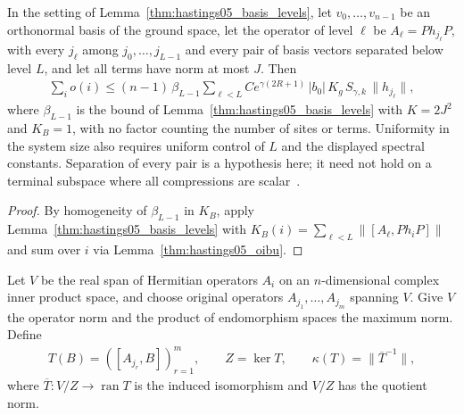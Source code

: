 \begin{lemma}
    \label{thm:hastings05_oibu_levels}
    \leanok
    In the setting of Lemma~\ref{thm:hastings05_basis_levels}, let $v_0,\dots,v_{n-1}$
    be an orthonormal basis of the ground space, let the operator of level
    $\ell$ be $A_\ell=Ph_{j_\ell}P$, with every $j_\ell$ among
    $j_0,\dots,j_{L-1}$ and every pair of basis vectors separated below level
    $L$, and let all terms have norm at most $J$. Then
    \begin{align}
        \sum_io(i)\le(n-1)\,\beta_{L-1}\sum_{\ell<L}Ce^{\gamma(2R+1)}\,|b_0|\,K_g\,
        S_{\gamma,k}\,\|h_{j_\ell}\|,
        \label{eq:hastings05_oibu_levels}
    \end{align}
    where $\beta_{L-1}$ is the bound of
    Lemma~\ref{thm:hastings05_basis_levels} with $K=2J^2$ and $K_B=1$,
    with no factor counting the number of sites or terms. Uniformity in the system
    size also requires uniform control of $L$ and the displayed spectral constants.
    Separation of every pair is a hypothesis here; it need not hold on a terminal
    subspace where all compressions are scalar~\cite{gap:hastings05_two_dim_ground_basis}.
\end{lemma}
\begin{proof}\leanok
    By homogeneity of $\beta_{L-1}$ in $K_B$, apply
    Lemma~\ref{thm:hastings05_basis_levels} with
    $K_B(i)=\sum_{\ell<L}\|[A_\ell,Ph_iP]\|$ and sum over $i$ via
    Lemma~\ref{thm:hastings05_oibu}.
\end{proof}

\begin{definition}
    \label{def:hastings05_commutator_conditioning}
    \leanok
    Let $V$ be the real span of Hermitian operators $A_i$ on an
    $n$-dimensional complex inner product space, and choose original operators
    $A_{j_1},\dots,A_{j_m}$ spanning $V$. Give $V$ the operator norm and the
    product of endomorphism spaces the maximum norm. Define
    \begin{align*}
        T(B)=([A_{j_r},B])_{r=1}^m,
        \qquad Z=\ker T,
        \qquad \kappa(T)=\|\overline T^{-1}\|,
    \end{align*}
    where $\overline T:V/Z\longrightarrow\operatorname{ran}T$ is the induced
    isomorphism and $V/Z$ has the quotient norm.
\end{definition}


